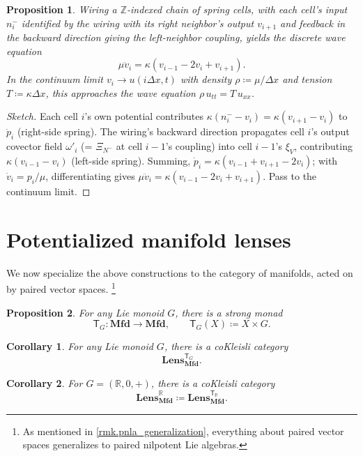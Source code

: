\documentclass[11pt, oneside, article]{memoir}
\theoremstyle{definition}
\theoremstyle{plain}
\newtheorem{proposition}[proposition]{Proposition}
\newtheorem{corollary}[corollary]{Corollary}
\newcommand{\Cat}[1]{\mathbf{#1}}%
\newcommand{\Fun}[1]{\mathsf{#1}}%
\newcommand{\zz}{\mathbb{Z}}
\newcommand{\rr}{\mathbb{R}}
\newcommand{\mfd}{\Cat{Mfd}}
\newcommand{\Lens}[1]{\Cat{Lens}_{#1}}
\newcommand{\lmfd}{\Lens{\mfd}}
\newcommand{\inpt}[1]{#1^{-}}
\begin{document}
\begin{proposition}\label{prop.spring_wave}
Wiring a $\zz$-indexed chain of spring cells, with each cell's input $\inpt n_i$ identified by the wiring with its right neighbor's output $v_{i+1}$ and feedback in the backward direction giving the left-neighbor coupling, yields the discrete wave equation
\[
\mu\ddot v_i=\kappa(v_{i-1}-2v_i+v_{i+1}).
\]
In the continuum limit $v_i\to u(i\Delta x,t)$ with density $\rho\coloneqq\mu/\Delta x$ and tension $T\coloneqq\kappa\Delta x$, this approaches the wave equation $\rho\,u_{tt}=T\,u_{xx}$.
\end{proposition}

\begin{proof}[Sketch]
Each cell $i$'s own potential contributes $\kappa(\inpt n_i-v_i)=\kappa(v_{i+1}-v_i)$ to $\dot p_i$ (right-side spring). The wiring's backward direction propagates cell $i$'s output covector field $\omega'_i$ (= $\Xi_{\inpt N}$ at cell $i-1$'s coupling) into cell $i-1$'s $\xi_V$, contributing $\kappa(v_{i-1}-v_i)$ (left-side spring). Summing, $\dot p_i=\kappa(v_{i-1}+v_{i+1}-2v_i)$; with $\dot v_i=p_i/\mu$, differentiating gives $\mu\ddot v_i=\kappa(v_{i-1}-2v_i+v_{i+1})$. Pass to the continuum limit.
\end{proof}

\clearpage
\clearpage

\appendix

\section{Potentialized manifold lenses}\label{sec.potlens_manifolds}

We now specialize the above constructions to the category of manifolds, acted on by paired vector spaces.%
\footnote{As mentioned in \cref{rmk.pnla_generalization}, everything about paired vector spaces generalizes to paired nilpotent Lie algebras.}

\begin{proposition}\label{prop.lie_monoid_strong_monad}
For any Lie monoid $G$, there is a strong monad
\[
\Fun T_G\colon\mfd\to\mfd,\qquad \Fun T_G(X)\coloneqq X\times G.
\]
\end{proposition}

\begin{corollary}\label{cor.lmfd_G}
For any Lie monoid $G$, there is a coKleisli category
\[
\Lens{\mfd}^{\Fun T_G}.
\]
\end{corollary}

\begin{corollary}\label{cor.lmfd_potential}
For $G=(\rr,0,+)$, there is a coKleisli category
\[
\lmfd^\rr\coloneqq\Lens{\mfd}^{\Fun T_\rr}.
\]
\end{corollary}
\end{document}
